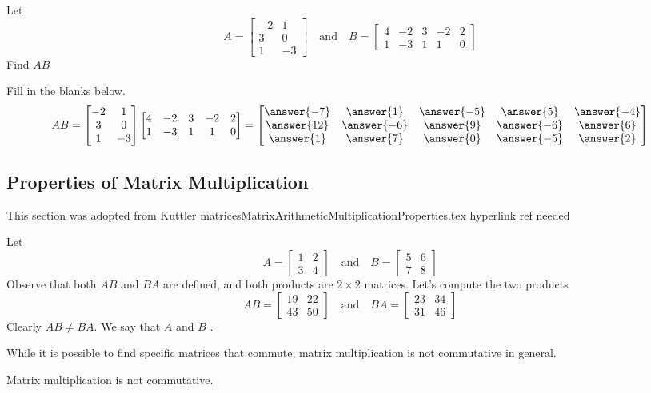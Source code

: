 \documentclass{ximera}
\begin{document}
\begin{example} Let
$$A=\begin{bmatrix}-2 & 1\\3 & 0\\1 & -3\end{bmatrix}\quad\text{and}\quad B=\begin{bmatrix}4 & -2 & 3 & -2 &2\\1 & -3 & 1 & 1 &0\end{bmatrix}$$
Find $AB$
\begin{explanation}
Fill in the blanks below.  
$$AB=\begin{bmatrix}-2 & 1\\3 & 0\\1 & -3\end{bmatrix}\begin{bmatrix}4 & -2 & 3 & -2 &2\\1 & -3 & 1 & 1 &0\end{bmatrix}=\begin{bmatrix}\answer{-7} &\answer{1} & \answer{-5} & \answer{5} & \answer{-4}\\\answer{12} & \answer{-6} & \answer{9} & \answer{-6} & \answer{6}\\\answer{1} & \answer{7} & \answer{0} & \answer{-5} & \answer{2}\end{bmatrix}$$

\end{explanation}
\end{example}

\subsection*{Properties of Matrix Multiplication}
{\color{red} This section was adopted from Kuttler matricesMatrixArithmeticMultiplicationProperties.tex hyperlink ref needed}
\begin{exploration}Let $$A=\begin{bmatrix}1&2\\3&4\end{bmatrix}\quad\text{and}\quad B=\begin{bmatrix}5&6\\7&8\end{bmatrix}$$
Observe that both $AB$ and $BA$ are defined, and both products are $2\times 2$ matrices.  Let's compute the two products
$$AB=\begin{bmatrix}19&22\\43&50\end{bmatrix}\quad\text{and}\quad BA=\begin{bmatrix}23&34\\31&46\end{bmatrix}$$
Clearly $AB\neq BA$. We say that $A$ and $B$ .
\end{exploration}
While it is possible to find specific matrices that commute, matrix multiplication is not commutative in general.
\begin{warning}Matrix multiplication is not commutative.
\end{warning}
\end{document}
